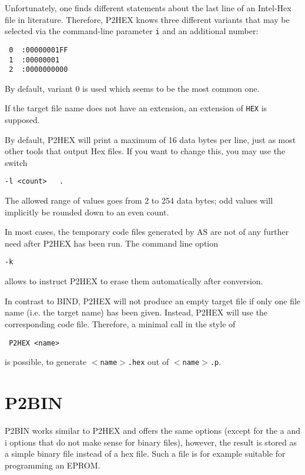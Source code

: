 \documentclass[12pt,twoside]{report}
\newcommand{\tty}[1]{{\tt #1}}
\newcommand{\asname}{{AS}}
\begin{document}
Unfortunately, one finds different statements about the last line of
an Intel-Hex file in literature.  Therefore, P2HEX knows three
different variants that may be selected via the command-line
parameter \tty{i} and an additional number:
\begin{verbatim}
 0  :00000001FF
 1  :00000001
 2  :0000000000
\end{verbatim}
By default, variant 0 is used which seems to be the most common one.

If the target file name does not have an extension, an extension of
\tty{HEX} is supposed.

By default, P2HEX will print a maximum of 16 data bytes per line,
just as most other tools that output Hex files.  If you want to
change this, you may use the switch
\begin{verbatim}
-l <count>   .
\end{verbatim}
The allowed range of values goes from 2 to 254 data bytes; odd values
will implicitly be rounded down to an even count.

In most cases, the temporary code files generated by \asname{} are not of
any further need after P2HEX has been run.  The command line option
\begin{verbatim}
-k
\end{verbatim}
allows to instruct P2HEX to erase them automatically after
conversion.

In contrast to BIND, P2HEX will not produce an empty target file if
only one file name (i.e. the target name) has been given.  Instead,
P2HEX will use the corresponding code file.  Therefore, a minimal
call in the style of
\begin{verbatim}
 P2HEX <name>
\end{verbatim}
is possible, to generate \tty{$<$name$>$.hex} out of \tty{$<$name$>$.p}.


\section{P2BIN}

P2BIN works similar to P2HEX and offers the same options (except for
the a and i options that do not make sense for binary files),
however, the result is stored as a simple binary file instead of a
hex file.  Such a file is for example suitable for programming an
EPROM.
\end{document}
